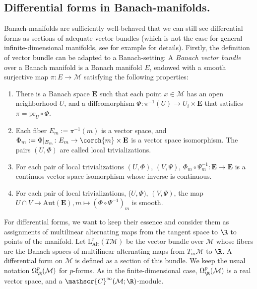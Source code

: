 \subsection{Differential forms in Banach-manifolds.}
Banach-manifolds are sufficiently well-behaved that we can still see differential forms as sections of adequate vector bundles (which is not the case for general infinite-dimensional manifolds, see for example \parencite[Appendix E]{Schmeding_2022} for details). Firstly, the definition of vector bundle can be adapted to a Banach-setting: A \textit{Banach vector bundle} over a Banach manifold is a Banach manifold \(E\), endowed with a smooth surjective map \(\pi\colon E \to \mathcal{M}\) satisfying the following properties:
\begin{enumerate}
    \item There is a Banach space \(\mathbf{E}\) such that each point \(x\in \mathcal{M}\) has an open neighborhood \(U\), and a diffeomorphism \(\Phi\colon \pi^{-1}(U) \to U_i \times \mathbf{E}\) that satisfies \(\pi=\mathrm{pr}_{U} \circ \Phi\).
    \item Each fiber \(E_m:=\pi^{-1}(m)\) is a vector space, and \(\Phi_m:=\Phi|_{E_m} \colon E_m \to \corch{m} \times \mathbf{E}\) is a vector space isomorphism. The pairs \((U, \Phi)\) are called local trivializations.
    \item For each pair of local trivializations \((U, \Phi)\), \((V, \Psi)\), \(\Phi_m \circ \Psi_m^{-1}\colon \mathbf{E} \to \mathbf{E}\) is a continuos vector space isomorphism whose inverse is continuous.
    \item For each pair of local trivializations, (\(U, \Phi)\), \((V, \Psi)\), the map \(U \cap V \to \mathrm{Aut}(\mathbf{E}),m \mapsto (\Phi \circ \Psi^{-1})_m\) is smooth.
\end{enumerate}

For differential forms, we want to keep their essence and consider them as assignments of multilinear alternating maps from the tangent space to \(\R\) to points of the manifold. Let \(\mathrm{L}_{\mathrm{Alt}}^r(T\mathcal{M})\) be the vector bundle over \(\mathcal{M}\) whose fibers are the Banach spaces of multilinear alternating maps from \(T_m\mathcal{M}\) to \(\R\). A differential form on \(\mathcal{M}\) is defined as a section of this bundle. We keep the usual notation \(\Omega^p_\R(\mathcal{M})\) for \(p\)-forms. As in the finite-dimensional case, \(\Omega_\R^p(\mathcal{M})\) is a real vector space, and a \(\mathscr{C}^\infty(\mathcal{M};\R)\)-module. \\

